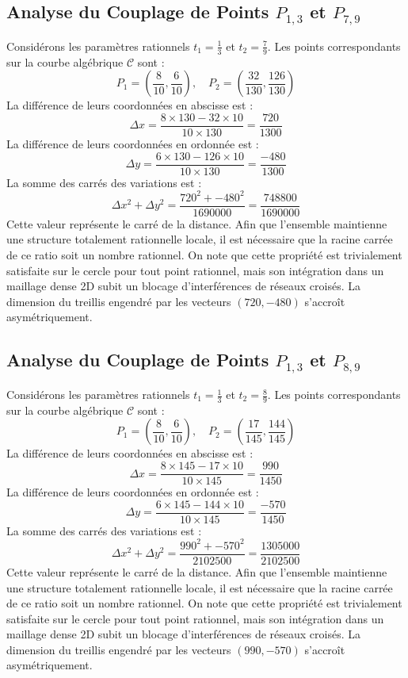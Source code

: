\documentclass[12pt, a4paper]{article}
\begin{document}
\subsection{Analyse du Couplage de Points $P_{1,3}$ et $P_{7,9}$}
Considérons les paramètres rationnels $t_1 = \frac{1}{3}$ et $t_2 = \frac{7}{9}$.
Les points correspondants sur la courbe algébrique $\mathcal{C}$ sont :
$$ P_1 = \left( \frac{8}{10}, \frac{6}{10} \right), \quad P_2 = \left( \frac{32}{130}, \frac{126}{130} \right) $$
La différence de leurs coordonnées en abscisse est :
$$ \Delta x = \frac{8 \times 130 - 32 \times 10}{10 \times 130} = \frac{720}{1300} $$
La différence de leurs coordonnées en ordonnée est :
$$ \Delta y = \frac{6 \times 130 - 126 \times 10}{10 \times 130} = \frac{-480}{1300} $$
La somme des carrés des variations est :
$$ \Delta x^2 + \Delta y^2 = \frac{ 720^2 + -480^2 }{ 1690000 } = \frac{ 748800 }{ 1690000 } $$
Cette valeur représente le carré de la distance. Afin que l'ensemble maintienne une structure totalement rationnelle locale, il est nécessaire que la racine carrée de ce ratio soit un nombre rationnel. On note que cette propriété est trivialement satisfaite sur le cercle pour tout point rationnel, mais son intégration dans un maillage dense 2D subit un blocage d'interférences de réseaux croisés. La dimension du treillis engendré par les vecteurs $( 720, -480 )$ s'accroît asymétriquement.


\subsection{Analyse du Couplage de Points $P_{1,3}$ et $P_{8,9}$}
Considérons les paramètres rationnels $t_1 = \frac{1}{3}$ et $t_2 = \frac{8}{9}$.
Les points correspondants sur la courbe algébrique $\mathcal{C}$ sont :
$$ P_1 = \left( \frac{8}{10}, \frac{6}{10} \right), \quad P_2 = \left( \frac{17}{145}, \frac{144}{145} \right) $$
La différence de leurs coordonnées en abscisse est :
$$ \Delta x = \frac{8 \times 145 - 17 \times 10}{10 \times 145} = \frac{990}{1450} $$
La différence de leurs coordonnées en ordonnée est :
$$ \Delta y = \frac{6 \times 145 - 144 \times 10}{10 \times 145} = \frac{-570}{1450} $$
La somme des carrés des variations est :
$$ \Delta x^2 + \Delta y^2 = \frac{ 990^2 + -570^2 }{ 2102500 } = \frac{ 1305000 }{ 2102500 } $$
Cette valeur représente le carré de la distance. Afin que l'ensemble maintienne une structure totalement rationnelle locale, il est nécessaire que la racine carrée de ce ratio soit un nombre rationnel. On note que cette propriété est trivialement satisfaite sur le cercle pour tout point rationnel, mais son intégration dans un maillage dense 2D subit un blocage d'interférences de réseaux croisés. La dimension du treillis engendré par les vecteurs $( 990, -570 )$ s'accroît asymétriquement.
\end{document}
